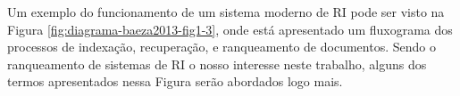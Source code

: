     
    
    Um exemplo do funcionamento de um sistema moderno de RI pode ser visto na Figura \ref{fig:diagrama-baeza2013-fig1-3}, onde está apresentado um fluxograma dos processos de indexação, recuperação, e ranqueamento de documentos. 
    Sendo o ranqueamento de sistemas de RI o nosso interesse neste trabalho, alguns dos termos apresentados nessa Figura serão abordados logo mais.
    
    
    
    

